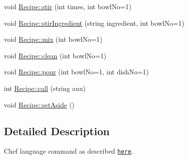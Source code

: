 \begin{DoxyCompactItemize}
void \hyperlink{group__Command_ga5b48c67eb04fc71c199bdf611c387c9e}{Recipe\-::stir} (int times, int bowl\-No=1)
\item 
void \hyperlink{group__Command_ga1f10bdb32b627eaa025d1313dbdc3c40}{Recipe\-::stir\-Ingredient} (string ingredient, int bowl\-No=1)
\item 
void \hyperlink{group__Command_gad9a02b3a48b606ba17dc91337c3f64c2}{Recipe\-::mix} (int bowl\-No=1)
\item 
void \hyperlink{group__Command_gae041e0eb15d1e40fe513b53803810dac}{Recipe\-::clean} (int bowl\-No=1)
\item 
void \hyperlink{group__Command_ga03848074a9e527439e6381e47d9f3749}{Recipe\-::pour} (int bowl\-No=1, int dish\-No=1)
\item 
int \hyperlink{group__Command_ga8822f6ec69a54e51222299b96e3b1923}{Recipe\-::call} (string aux)
\item 
void \hyperlink{group__Command_ga4889710ccae668fb039e4dfa0ea2dae7}{Recipe\-::set\-Aside} ()
\end{DoxyCompactItemize}


\subsection{Detailed Description}
Chef language command as described \href{http://www.dangermouse.net/esoteric/chef.html}{\tt here}. 

